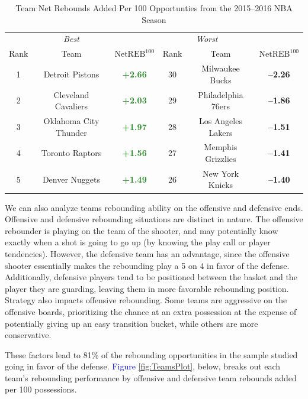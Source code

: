 \documentclass{article}
\begin{document}
\renewcommand{\arraystretch}{1.0}
\begin{table}[htb]
  \centering
  \caption{Team Net Rebounds Added Per 100 Opportunties from the 2015--2016 NBA Season}\label{table:TeamScores}
  \begin{tabular}{cccccc}
  \toprule
 &\multicolumn{1}{c}{{\it Best}}
&
\multicolumn{4}{c}{{\it \quad \quad \quad Worst}} \\  \cmidrule(r){2-2}\cmidrule(l){5-5}
Rank & Team & $\text{NetREB}^{100}$ & Rank & Team & $\text{NetREB}^{100}$ \\
	\midrule
	1 & Detroit Pistons & {\bf \textcolor{ForestGreen}{+2.66}} & 30 & Milwaukee Bucks & {\bf \textcolor{BrickRed}{--2.26}}  \\
	2 & Cleveland Cavaliers & {\bf \textcolor{ForestGreen}{+2.03}} &  29 & Philadelphia 76ers & {\bf \textcolor{BrickRed}{--1.86}}  \\
	3 & Oklahoma City Thunder  & {\bf \textcolor{ForestGreen}{+1.97}} &  28 & Los Angeles Lakers & {\bf \textcolor{BrickRed}{--1.51}} \\
	4 & Toronto Raptors  & {\bf \textcolor{ForestGreen}{+1.56}} & 27 & Memphis Grizzlies & {\bf \textcolor{BrickRed}{--1.41}} \\
	5 & Denver Nuggets & {\bf \textcolor{ForestGreen}{+1.49}} & 26 & New York Knicks & {\bf \textcolor{BrickRed}{--1.40}} \\
\bottomrule
  \end{tabular}
\end{table}

\bigbreak
\noindent
We can also analyze teams rebounding ability on the offensive and defensive ends. Offensive and defensive rebounding situations are distinct in nature. The offensive rebounder is playing on the team of the shooter, and may potentially know exactly when a shot is going to go up (by knowing the play call or player tendencies). However, the defensive team has an advantage, since the offensive shooter essentially makes the rebounding play a 5 on 4 in favor of the defense. Additionally, defensive players tend to be positioned between the basket and the player they are guarding, leaving them in more favorable rebounding position. Strategy also impacts offensive rebounding. Some teams are aggressive on the offensive boards, prioritizing the chance at an extra possession at the expense of potentially giving up an easy transition bucket, while others are more conservative.

\bigbreak
\noindent
These factors lead to 81\% of the rebounding opportunities in the sample studied going in favor of the defense. \textcolor{blue}{Figure} \ref{fig:TeamsPlot}, below, breaks out each team's rebounding performance by offensive and defensive team rebounds added per 100 possessions.
\end{document}
